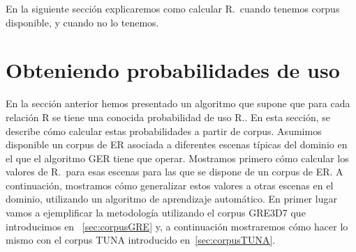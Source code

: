 










En la siguiente secci\'on explicaremos como calcular R.\puse\ cuando tenemos corpus disponible, y cuando no lo tenemos.

\section{Obteniendo probabilidades de uso}

\label{sec:learning}



En la secci\'on anterior hemos presentado un algoritmo que supone que para
cada relaci\'on R se tiene una conocida
probabilidad de uso R.\puse. En esta secci\'on, se describe c\'omo
calcular estas probabilidades a partir de corpus. Asumimos disponible un corpus de ER asociada a diferentes
escenas t\'{i}picas del dominio en el que el algoritmo GER tiene que operar. Mostramos primero c\'omo calcular los valores de R.\puse\ para
esas escenas para las que se dispone de un corpus de ER. A continuaci\'on, mostramos c\'omo
generalizar estos valores a otras escenas en el dominio, utilizando un
algoritmo de aprendizaje autom\'atico. En primer lugar vamos a ejemplificar la
metodolog\'{i}a utilizando el corpus GRE3D7 que introducimos en ~\ref{sec:corpusGRE} y, a continuaci\'on mostraremos c\'omo hacer lo mismo con el corpus TUNA introducido en~\ref{sec:corpusTUNA}.


